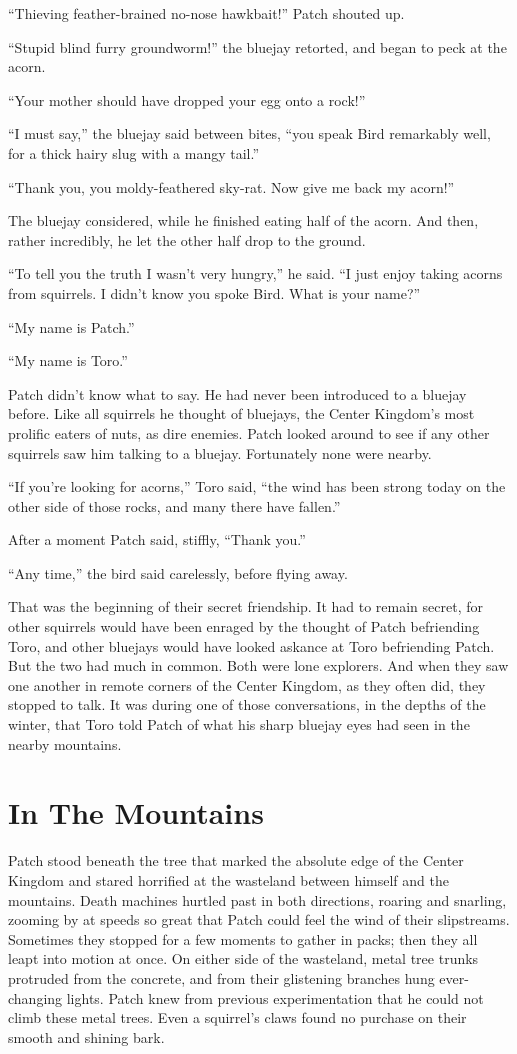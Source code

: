 \documentclass[ebook,oneside,openany,17pt]{memoir}
\renewcommand{\thechapter}{\Roman{chapter}}
\newcounter{sections}
\newcommand{\sections}[1]{%
  \section*{#1}
  \addtocounter{sections}{1}%
  \pdfbookmark[1]{#1}{section.\thechapter.\thesections}}
\begin{document}
“Thieving feather-brained no-nose hawkbait!” Patch shouted up.

“Stupid blind furry groundworm!” the bluejay retorted, and began to
peck at the acorn.

“Your mother should have dropped your egg onto a rock!”

“I must say,” the bluejay said between bites, “you speak Bird
remarkably well, for a thick hairy slug with a mangy tail.”

“Thank you, you moldy-feathered sky-rat. Now give me back my acorn!”

The bluejay considered, while he finished eating half of the
acorn. And then, rather incredibly, he let the other half drop to the
ground.

“To tell you the truth I wasn’t very hungry,” he said. “I just enjoy
taking acorns from squirrels. I didn’t know you spoke Bird. What is
your name?”

“My name is Patch.”

“My name is Toro.”

Patch didn’t know what to say. He had never been introduced to a
bluejay before. Like all squirrels he thought of bluejays, the Center
Kingdom’s most prolific eaters of nuts, as dire enemies. Patch looked
around to see if any other squirrels saw him talking to a
bluejay. Fortunately none were nearby.

“If you’re looking for acorns,” Toro said, “the wind has been strong
today on the other side of those rocks, and many there have fallen.”

After a moment Patch said, stiffly, “Thank you.”

“Any time,” the bird said carelessly, before flying away.

That was the beginning of their secret friendship. It had to remain
secret, for other squirrels would have been enraged by the thought of
Patch befriending Toro, and other bluejays would have looked askance
at Toro befriending Patch. But the two had much in common. Both were
lone explorers. And when they saw one another in remote corners of the
Center Kingdom, as they often did, they stopped to talk. It was during
one of those conversations, in the depths of the winter, that Toro
told Patch of what his sharp bluejay eyes had seen in the nearby
mountains.


\sections{In The Mountains}

Patch stood beneath the tree that marked the absolute edge of the
Center Kingdom and stared horrified at the wasteland between himself
and the mountains. Death machines hurtled past in both directions,
roaring and snarling, zooming by at speeds so great that Patch could
feel the wind of their slipstreams. Sometimes they stopped for a few
moments to gather in packs; then they all leapt into motion at
once. On either side of the wasteland, metal tree trunks protruded
from the concrete, and from their glistening branches hung
ever-changing lights. Patch knew from previous experimentation that he
could not climb these metal trees. Even a squirrel’s claws found no
purchase on their smooth and shining bark.
\end{document}
